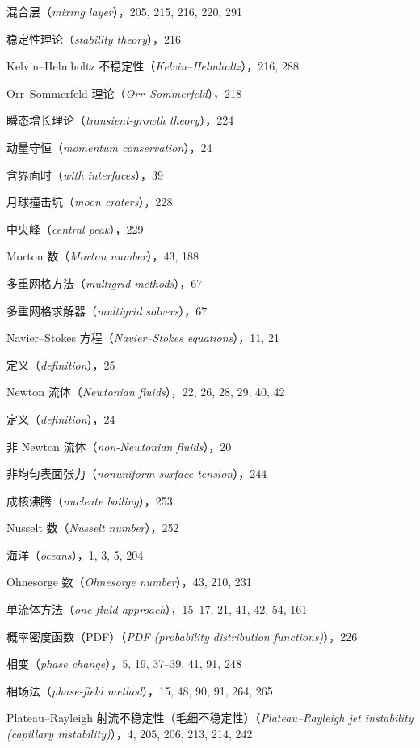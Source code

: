 \documentclass[11pt,a4paper,openany,fontset=none]{ctexbook}
\begin{document}
混合层（\textit{mixing layer}），205, 215, 216, 220, 291\par
稳定性理论（\textit{stability theory}），216\par
Kelvin--Helmholtz 不稳定性（\textit{Kelvin–Helmholtz}），216, 288\par
Orr--Sommerfeld 理论（\textit{Orr–Sommerfeld}），218\par
瞬态增长理论（\textit{transient-growth theory}），224\par
动量守恒（\textit{momentum conservation}），24\par
含界面时（\textit{with interfaces}），39\par
月球撞击坑（\textit{moon craters}），228\par
中央峰（\textit{central peak}），229\par
Morton 数（\textit{Morton number}），43, 188\par
多重网格方法（\textit{multigrid methods}），67\par
多重网格求解器（\textit{multigrid solvers}），67\par
Navier--Stokes 方程（\textit{Navier–Stokes equations}），11, 21\par
定义（\textit{definition}），25\par
Newton 流体（\textit{Newtonian fluids}），22, 26, 28, 29, 40, 42\par
定义（\textit{definition}），24\par
非 Newton 流体（\textit{non-Newtonian fluids}），20\par
非均匀表面张力（\textit{nonuniform surface tension}），244\par
成核沸腾（\textit{nucleate boiling}），253\par
Nusselt 数（\textit{Nusselt number}），252\par
海洋（\textit{oceans}），1, 3, 5, 204\par
Ohnesorge 数（\textit{Ohnesorge number}），43, 210, 231\par
单流体方法（\textit{one-fluid approach}），15--17, 21, 41, 42, 54, 161\par
概率密度函数（PDF）（\textit{PDF (probability distribution functions)}），226\par
相变（\textit{phase change}），5, 19, 37--39, 41, 91, 248\par
相场法（\textit{phase-field method}），15, 48, 90, 91, 264, 265\par
Plateau--Rayleigh 射流不稳定性（毛细不稳定性）（\textit{Plateau--Rayleigh jet instability (capillary instability)}），4, 205, 206, 213, 214, 242\par
\end{document}
